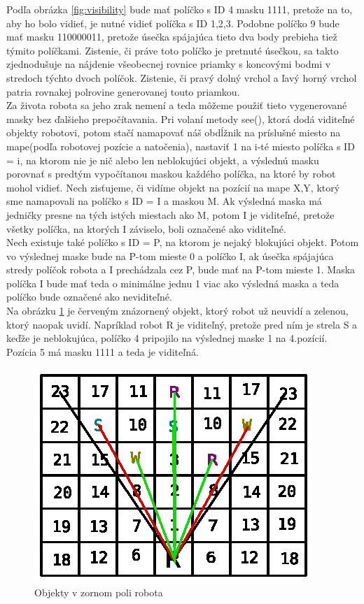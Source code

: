 Podľa obrázka \ref{fig:visibility} bude mať políčko s ID 4 masku 1111, pretože na to, aby ho bolo vidieť, je nutné vidieť políčka s ID 1,2,3. Podobne políčko 9 bude mať masku 110000011, pretože úsečka spájajúca tieto dva body prebieha tiež týmito políčkami. Zistenie, či práve toto políčko je pretnuté úsečkou, sa takto zjednodušuje na nájdenie všeobecnej rovnice priamky s koncovými bodmi v stredoch týchto dvoch políčok. Zistenie, či pravý dolný vrchol a ľavý horný vrchol patria rovnakej polrovine generovanej touto priamkou.\\
Za života robota sa jeho zrak nemení a teda môžeme použiť tieto vygenerované masky bez ďalšieho prepočítavania. Pri volaní metody see(), ktorá dodá viditeľné objekty robotovi, potom stačí namapovať náš obdĺžnik na príslušné miesto na mape(podľa robotovej pozície a natočenia), nastaviť 1 na i-té miesto políčka s ID = i, na ktorom nie je nič alebo len neblokujúci objekt, a výslednú masku porovnať s predtým vypočítanou maskou každého políčka, na ktoré by robot mohol vidieť. Nech zisťujeme, či vidíme objekt na pozícií na mape X,Y, ktorý sme namapovali na políčko s ID = I a maskou M. Ak výsledná maska má jedničky presne na tých istých miestach ako M, potom I je viditeľné, pretože všetky políčka, na ktorých I záviselo, boli označené ako viditeľné. \\
Nech existuje také políčko s ID = P, na ktorom je nejaký blokujúci objekt. Potom vo výslednej maske bude na P-tom mieste 0 a políčko I, ak úsečka spájajúca stredy políčok robota a I prechádzala cez P, bude mať na P-tom mieste 1. Maska políčka I bude mať teda o minimálne jednu 1 viac ako výsledná maska a teda políčko bude označené ako neviditeľné.\\
Na obrázku \ref{fig:visibleo} je červeným znázornený objekt, ktorý robot už neuvidí a zelenou, ktorý naopak uvidí. Napríklad robot R je viditeľný, pretože pred ním je strela S a keďže je neblokujúca, políčko 4 pripojilo na výslednej maske 1 na 4.pozícií. Pozícia 5 má masku 1111 a teda je viditeľná.
\begin{figure}
\centering
\includegraphics[totalheight=0.4\textheight,width=.8\textwidth]{VisibleObjects}
\caption { Objekty v zornom poli robota}
\label{fig:visibleo}
\end{figure}
